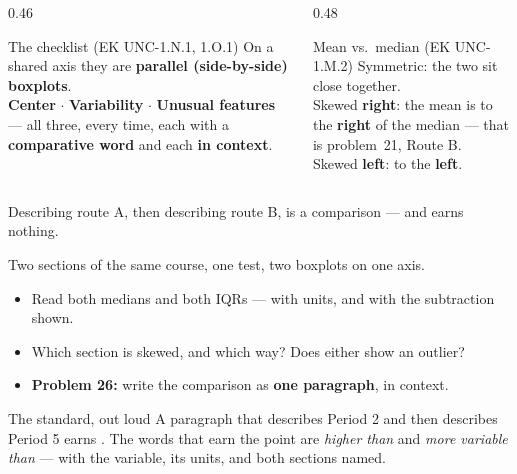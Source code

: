 \documentclass[aspectratio=169, 11pt]{beamer}
\begin{document}
\begin{frame}[t, plain]
  \vspace{4pt}
  \begin{columns}[t]
    \begin{column}{0.46\textwidth}
      \begin{block}{The checklist (EK UNC-1.N.1, 1.O.1)}
        On a shared axis they are \textbf{parallel (side-by-side) boxplots}.\\[3pt]
        \textbf{Center} $\cdot$ \textbf{Variability} $\cdot$ \textbf{Unusual features} --- all
        three, every time, each with a \textbf{comparative word} and each \textbf{in context}.
      \end{block}
    \end{column}
    \begin{column}{0.48\textwidth}
      \begin{block}{Mean vs.\ median (EK UNC-1.M.2)}
        Symmetric: the two sit close together.\\[3pt]
        Skewed \textbf{right}: the mean is to the \textbf{right} of the median --- that is
        problem~21, Route B.\\[3pt]
        Skewed \textbf{left}: to the \textbf{left}.
      \end{block}
    \end{column}
  \end{columns}
  \vspace{10pt}
  \begin{center}
    {\large Describing route A, then describing route B, is  a comparison ---
    and earns nothing.}
  \end{center}
\end{frame}

\begin{frame}[t, plain]
  Two sections of the same course, one test, two boxplots on one axis.
  \begin{itemize}\setlength{\itemsep}{5pt}
    \item Read both medians and both IQRs --- with units, and with the subtraction shown.
    \item Which section is skewed, and which way? Does either show an outlier?
    \item \textbf{Problem 26:} write the comparison as \textbf{one paragraph}, in context.
  \end{itemize}
  \begin{block}{The standard, out loud}
    A paragraph that describes Period 2 and then describes Period 5 earns .
    The words that earn the point are \emph{higher than} and \emph{more variable than} --- with
    the variable, its units, and both sections named.
  \end{block}
\end{frame}
\end{document}
